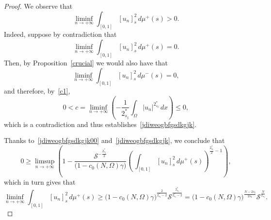 \documentclass[12pt,a4paper,intlimits,sumlimits]{amsart}
\theoremstyle{definition}
\theoremstyle{plain}
\numberwithin{equation}{section}
\renewcommand{\le}{\leqslant}
\renewcommand{\ge}{\geqslant}
\begin{document}
\begin{proof}
We observe that
\begin{equation}\label{jdiweogbfgsdkgjk}
\liminf_{n\to+\infty} \int_{[{{ 0 }}, 1]} [u_n]^2_{s}\, d\mu^+ (s)>0.
\end{equation}
Indeed, suppose by contradiction that
\begin{equation*}
\liminf_{n\to+\infty} \int_{[{{ 0 }}, 1]} [u_n]^2_{s}\, d\mu^+ (s)=0.
\end{equation*}
Then, by Proposition~\ref{crucial} we would also have that
\begin{equation*}
\liminf_{n\to+\infty} \int_{[{{ 0 }}, 1]} [u_n]^2_{s}\, d\mu^- (s)=0,
\end{equation*}
and therefore, by~\eqref{c1},
\begin{equation*}
0<c=\liminf_{n\to+\infty}\left(-\frac{1}{2_{s_\sharp}^*} \int_\Omega |u_n|^{2_{s_\sharp}^*}\, dx\right)\le 0,
\end{equation*}
which is a contradiction and thus establishes~\eqref{jdiweogbfgsdkgjk}.

Thanks to~\eqref{jdiweogbfgsdkgjk00} and~\eqref{jdiweogbfgsdkgjk},
we conclude that
\begin{equation*}
0\ge \limsup_{n\to+\infty} 
\left(1 - \frac{\mathcal{S}^{-\frac{2_{s_\sharp}^*}2}}{\big(1-c_0(N,\Omega)\gamma\big)}
\left(\, \int_{[{{ 0 }}, 1]} [u_n]^2_{s}\, d\mu^+ (s)\right)^{\frac{2_{s_\sharp}^*}2-1 }\right),
\end{equation*}
which in turn gives that
\begin{equation}\label{dhuwegi4utg4u3gtu43}
\liminf_{n\to+\infty}\int_{[{{ 0 }}, 1]} [u_n]^2_{s}\, d\mu^+ (s)\ge\big(1-c_0(N,\Omega)\gamma\big)^{\frac2{2_{s_\sharp}^*-2} }
\mathcal{S}^{\frac{2_{s_\sharp}^*}{2_{s_\sharp}^*-2}}
=\big(1-c_0(N,\Omega)\gamma\big)^{\frac{N-2s_\sharp}{2s_\sharp} }
\mathcal{S}^{\frac{N}{2_{s_\sharp}}}.
\end{equation}


\end{proof}
\end{document}

